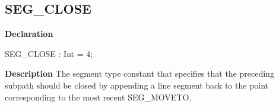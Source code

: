 \documentclass{report}
\newif\ifpdf
\begin{document}
\subsection*{SEG{\_}CLOSE}
\fi
\label{NewPascal.GUI.Geom-SEG_CLOSE}
\begin{list}{}{
\setlength{\itemindent}{0cm}
\setlength{\listparindent}{0cm}
\setlength{\leftmargin}{\evensidemargin}
\addtolength{\leftmargin}{\tmplength}
\settowidth{\labelsep}{X}
\addtolength{\leftmargin}{\labelsep}
\setlength{\labelwidth}{\tmplength}
}
\item[\textbf{Declaration}\hfill]
\ifpdf
\begin{flushleft}
\fi
\begin{ttfamily}
SEG{\_}CLOSE      : Int = 4;\end{ttfamily}

\ifpdf
\end{flushleft}
\fi

\par
\item[\textbf{Description}]
The segment type constant that specifies that the preceding subpath should be closed by appending a line segment back to the point corresponding to the most recent SEG{\_}MOVETO.

\end{list}
\end{document}
